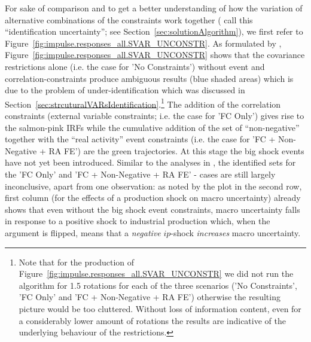 \documentclass[a4paper,11pt,listof=nochaptergap,oneside,pointednumbers,bibtotoc,bigheadings,liststotoc,hidelinks]{scrbook}
\theoremstyle{mysatz}
\theoremstyle{mydefinition}
\theoremstyle{mytheorem}
\theoremstyle{mybemerkung}
\begin{document}
For sake of comparison and to get a better understanding of how the variation of alternative combinations of the constraints work together (\citet{ludvigsonetal:19} call this ``identification uncertainty''; see Section~\ref{sec:solutionAlgorithm}), we first refer to Figure~\ref{fig:impulse.responses_all.SVAR_UNCONSTR}. As formulated by \citet{ludvigsonetal:19}, Figure~\ref{fig:impulse.responses_all.SVAR_UNCONSTR} shows that the covariance restrictions alone (i.e. the case for 'No Constraints') without event and correlation-constraints produce ambiguous results (blue shaded areas) which is due to the problem of under-identification which was discussed in Section~\ref{sec:strcuturalVARsIdentification}.\footnote{Note that for the production of Figure~\ref{fig:impulse.responses_all.SVAR_UNCONSTR} we did not run the algorithm for 1.5 rotations for each of the three scenarios ('No Constraints', 'FC Only' and 'FC + Non-Negative + RA FE') otherwise the resulting picture would be too cluttered. Without loss of information content, even for a considerably lower amount of rotations the results are indicative of the underlying behaviour of the restrictions.} The addition of the correlation constraints (external variable constraints; i.e. the case for 'FC Only') gives rise to the salmon-pink IRFs while the cumulative addition of the set of ``non-negative'' together with the ``real activity'' event constraints (i.e. the case for 'FC + Non-Negative + RA FE') are the green trajectories. At this stage the big shock events have not yet been introduced. Similar to the analyses in \citet{ludvigsonetal:19}, the identified sets for the 'FC Only' and 'FC + Non-Negative + RA FE' - cases are still largely inconclusive, apart from one observation: as noted by \citet{ludvigsonetal:19} the plot in the second row, first column (for the effects of a production shock on macro uncertainty) already shows that even without the big shock event constraints, macro uncertainty falls in response to a positive shock to industrial production which, when the argument is flipped, means that a \textit{negative} $ip$-shock \textit{increases} macro uncertainty.
\end{document}
